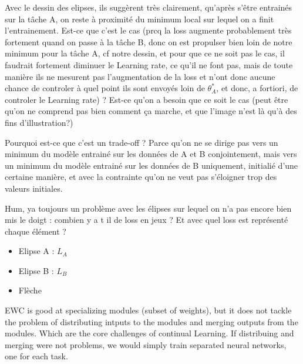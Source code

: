\documentclass[11pt]{article}
\begin{document}
\vspace{1mm}
\noindent
Avec le dessin des elipses, ils suggèrent très clairement, qu'après s'être entrainés sur la tâche A, on reste à proximité du minimum local sur lequel on a finit l'entrainement. Est-ce que c'est le cas (prcq la loss augmente probablement très fortement quand on passe à la tâche B, donc on est propulser bien loin de notre minimum pour la tâche A, cf notre dessin, et pour que ce ne soit pas le cas, il faudrait fortement diminuer le Learning rate, ce qu'il ne font pas, mais de toute manière ils ne mesurent pas l'augmentation de la loss et n'ont donc aucune chance de controler à quel point ils sont envoyés loin de $\theta_A^*$, et donc, a fortiori, de controler le Learning rate) ? Est-ce qu'on a besoin que ce soit le cas (peut être qu'on ne comprend pas bien comment ça marche, et que l'image n'est là qu'à des fins d'illustration?)

\vspace{1mm}
\noindent
Pourquoi est-ce que c'est un trade-off ? Parce qu'on ne se dirige pas vers un minimum du modèle entrainé sur les données de A et B conjointement, mais vers un minimum du modèle entrainé sur les données de B uniquement, initialié d'une certaine manière, et avec la contrainte qu'on ne veut pas s'éloigner trop des valeurs initiales.

\vspace{1mm}
\noindent
Hum, ya toujours un problème avec les élipses sur lequel on n'a pas encore bien mis le doigt : combien y a t il de loss en jeux ? Et avec quel loss est représenté chaque élément ?
\begin{itemize}
    \item Elipse A : $L_A$
    \item Elipse B : $L_B$
    \item Flèche
\end{itemize}

\vspace{1mm}
\noindent
EWC is good at specializing modules (subset of weights), but it does not tackle the problem of distributing intputs to the modules and merging outputs from the modules. Which are the core challenges of continual Learning. If distribuing and merging were not problems, we would simply train separated neural networks, one for each task.
\end{document}

